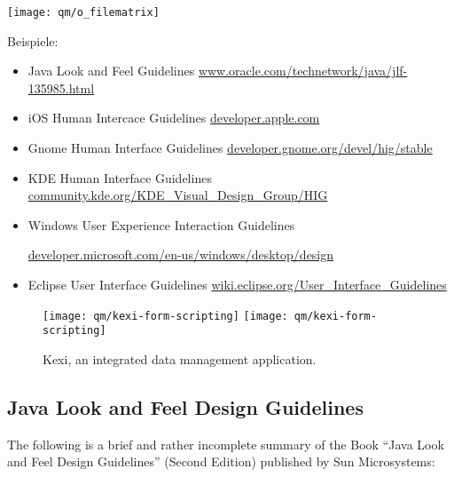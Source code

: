 \newslide
\texttt{[image: qm/o\_filematrix]}

\newslide
Beispiele:
\begin{itemize}
\item Java Look and Feel Guidelines
\href{http://www.oracle.com/technetwork/java/jlf-135985.html}
    {www.oracle.com/technetwork/java/jlf-135985.html}
\item iOS Human Intercace Guidelines
  \href{https://developer.apple.com/ios/human-interface-guidelines/overview/design-principles/}{developer.apple.com}
\item Gnome Human Interface Guidelines
  \href{https://developer.gnome.org/hig/stable}
   {developer.gnome.org/devel/hig/stable}
 \item KDE Human Interface Guidelines \href{https://community.kde.org/KDE_Visual_Design_Group/HIG}
     {community.kde.org/KDE\_Visual\_Design\_Group/HIG}
   \item Windows User Experience Interaction Guidelines

     \href{https://developer.microsoft.com/en-us/windows/desktop/design}
          {developer.microsoft.com/en-us/windows/desktop/design}
 \item Eclipse User Interface Guidelines
\href{http://wiki.eclipse.org/User_Interface_Guidelines}
   {wiki.eclipse.org/User\_Interface\_Guidelines}
%
\end{itemize}
\begin{figure}[H]
\ifslides
\centering
\texttt{[image: qm/kexi-form-scripting]}
\else
\texttt{[image: qm/kexi-form-scripting]}
\fi
\caption{Kexi, an integrated data management application.}
\end{figure}
%
\subsection{Java Look and Feel Design Guidelines}
The following is
a brief and rather incomplete summary of the Book ``Java Look and Feel Design
Guidelines'' (Second Edition) published by Sun Microsystems:

